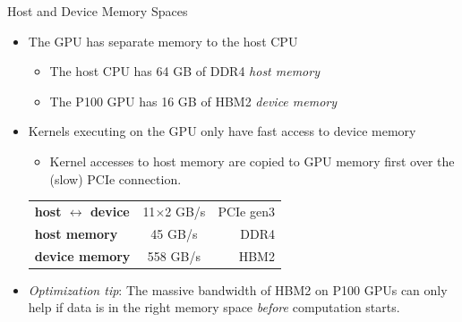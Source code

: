\documentclass[aspectratio=43]{beamer}
\begin{document}
\begin{frame}[fragile]{Host and Device Memory Spaces}
    \begin{itemize}
        \item The GPU has separate memory to the host CPU
            \begin{itemize}
                \item The host CPU has 64 GB of DDR4 \emph{host memory}
                \item The P100 GPU has 16 GB of HBM2 \emph{device memory}
            \end{itemize}
        \item Kernels executing on the GPU only have fast access to device memory
            \begin{itemize}
                \item Kernel accesses to host memory are copied to GPU memory first over the (slow) PCIe connection.
            \end{itemize}

            \begin{center}
                \begin{tabular}{lcr}
                    \textbf{host $\leftrightarrow$ device} & 11$\times$2 GB/s & PCIe gen3 \\
                    \textbf{host memory}                   & 45 GB/s  & DDR4      \\
                    \textbf{device memory}                 & 558 GB/s & HBM2
                \end{tabular}
            \end{center}

        \item \emph{Optimization tip}: The massive bandwidth of HBM2 on P100 GPUs can only help if data is in the right memory space \emph{before} computation starts.
    \end{itemize}

\end{frame}
\end{document}
